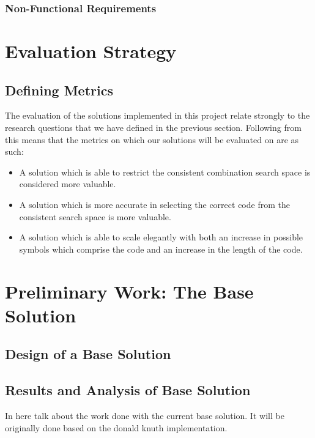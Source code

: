 \documentclass[12pt]{article}  %
\theoremstyle{definition}
\theoremstyle{remark}
\begin{document}
\subsubsection {Non-Functional Requirements}

\newpage                     %
\section{Evaluation Strategy}\label{ss:back}

\subsection {Defining Metrics}

The evaluation of the solutions implemented in this project relate strongly to the research questions that we have defined in the previous section. Following from this means that the metrics on which our solutions will be evaluated on are as such:
\begin {itemize}
	\item {A solution which is able to restrict the consistent combination search space is considered more valuable.}
	\item {A solution which is more accurate in selecting the correct code from the consistent search space is more valuable.}
	\item {A solution which is able to scale elegantly with both an increase in possible symbols which comprise the code and an increase in the length of the code.}
\end{itemize}

\newpage
\section {Preliminary Work: The Base Solution}

\subsection {Design of a Base Solution}

\subsection {Results and Analysis of Base Solution}
In here talk about the work done with the current base solution. It will be originally done based on the donald knuth implementation.


\newpage                     %
\end{document}
